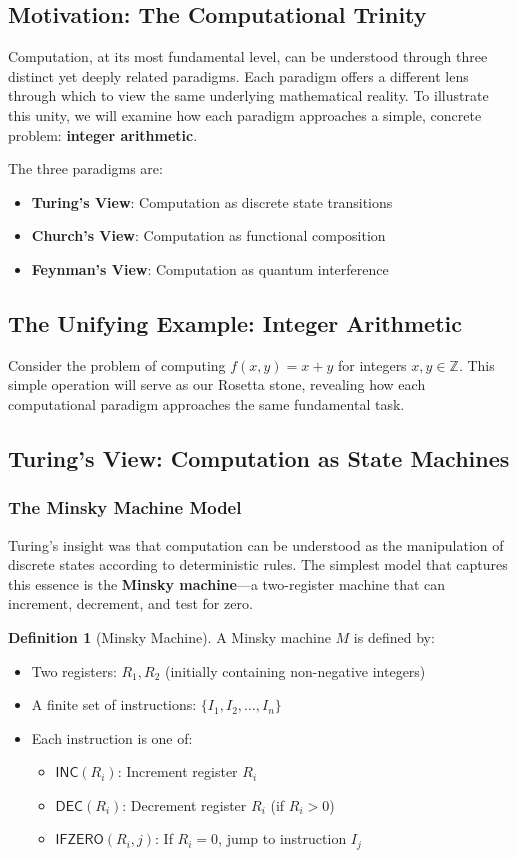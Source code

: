 \documentclass[11pt,a4paper]{article}
\theoremstyle{definition}
\newtheorem{definition}{Definition}[section]
\begin{document}
\subsection{Motivation: The Computational Trinity}
Computation, at its most fundamental level, can be understood through three distinct yet deeply related paradigms. Each paradigm offers a different lens through which to view the same underlying mathematical reality. To illustrate this unity, we will examine how each paradigm approaches a simple, concrete problem: \textbf{integer arithmetic}.

The three paradigms are:
\begin{itemize}
\item \textbf{Turing's View}: Computation as discrete state transitions
\item \textbf{Church's View}: Computation as functional composition  
\item \textbf{Feynman's View}: Computation as quantum interference
\end{itemize}

\subsection{The Unifying Example: Integer Arithmetic}
Consider the problem of computing $f(x,y) = x + y$ for integers $x, y \in \mathbb{Z}$. This simple operation will serve as our Rosetta stone, revealing how each computational paradigm approaches the same fundamental task.

\subsection{Turing's View: Computation as State Machines}
\subsubsection{The Minsky Machine Model}
Turing's insight was that computation can be understood as the manipulation of discrete states according to deterministic rules. The simplest model that captures this essence is the \textbf{Minsky machine}—a two-register machine that can increment, decrement, and test for zero.

\begin{definition}[Minsky Machine]
A Minsky machine $M$ is defined by:
\begin{itemize}
\item Two registers: $R_1, R_2$ (initially containing non-negative integers)
\item A finite set of instructions: $\{I_1, I_2, \ldots, I_n\}$
\item Each instruction is one of:
  \begin{itemize}
  \item $\mathsf{INC}(R_i)$: Increment register $R_i$
  \item $\mathsf{DEC}(R_i)$: Decrement register $R_i$ (if $R_i > 0$)
  \item $\mathsf{IFZERO}(R_i, j)$: If $R_i = 0$, jump to instruction $I_j$
  \end{itemize}
\end{itemize}
\end{definition}
\end{document}
